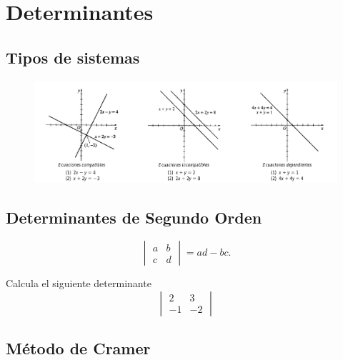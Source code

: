 
\section{Determinantes}


\subsection{Tipos de sistemas}
\begin{figure}
	\centering
	\includegraphics[width=12cm,keepaspectratio=true]{./precalculo/IM0402.png}
	\label{fig:0401}
\end{figure}

\subsection{Determinantes de Segundo Orden}

	\begin{definicion}
		$$
		\begin{vmatrix}
			a & b \\ c & d
		\end{vmatrix}=ad-bc.
		$$
	\end{definicion}




	\begin{resuelto}
		Calcula el siguiente determinante
		$$
		\begin{vmatrix} 2 & 3 \\ -1 & -2 \end{vmatrix}
		$$
	\end{resuelto}



\subsection{Método de Cramer}

